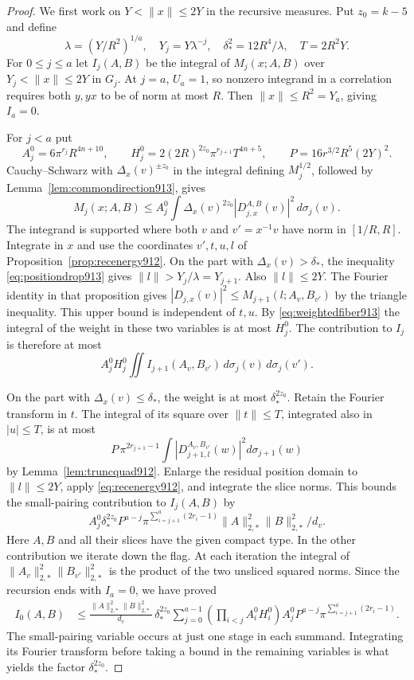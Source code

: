\documentclass[a4paper,11pt]{article}
\theoremstyle{definition}
\theoremstyle{remark}
\numberwithin{equation}{section}
\begin{document}
\begin{proof}
We first work on \(Y<\|x\|\le2Y\) in the recursive measures.
Put \(z_0=k-5\) and define
\[
  \lambda=(Y/R^2)^{1/a},\quad Y_j=Y\lambda^{-j},\quad
  \delta_*^2=12 R^4/\lambda,\quad T=2R^2Y.
\]
For \(0\le j\le a\) let \(I_j(A,B)\) be the integral of
\(M_j(x;A,B)\) over \(Y_j<\|x\|\le2Y\) in \(G_j\).
At \(j=a\), \(U_a=1\), so nonzero integrand in a correlation
requires both \(y,yx\) to be of norm at most \(R\).
Then \(\|x\|\le R^2=Y_a\), giving \(I_a=0\).

For \(j<a\) put
\[
 A_j^0=6\pi^{r_j}R^{4n+10},\qquad
 H_j^0=2(2R)^{2z_0}\pi^{r_{j+1}}T^{4n+5},\qquad
 P=16r^{3/2}R^5(2Y)^2 .
\]
Cauchy--Schwarz with \(\Delta_x(v)^{\pm z_0}\) in the integral
defining \(M_j^{1/2}\), followed by Lemma~\ref{lem:commondirection913},
gives
\[
       M_j(x;A,B)\le A_j^0
          \int \Delta_x(v)^{2z_0}|D_{j,x}^{A,B}(v)|^2\,d\sigma_j(v).
\]
The integrand is supported where both \(v\) and \(v'=x^{-1}v\)
have norm in \([1/R,R]\). Integrate in \(x\) and use the
coordinates \(v',t,u,l\) of Proposition~\ref{prop:recenergy912}.
On the part with \(\Delta_x(v)>\delta_*\), the inequality
\eqref{eq:positiondrop913} gives \(\|l\|>Y_j/\lambda=Y_{j+1}\).
Also \(\|l\|\le2Y\). The Fourier identity in that proposition
gives \(|D_{j,x}(v)|^2\le M_{j+1}(l;A_v,B_{v'})\) by the
triangle inequality. This upper bound is independent of \(t,u\).
By \eqref{eq:weightedfiber913} the integral of the weight in
these two variables is at most \(H_j^0\). The contribution to
\(I_j\) is therefore at most
\[
    A_j^0 H_j^0
       \iint I_{j+1}(A_v,B_{v'})\,d\sigma_j(v)\,d\sigma_j(v').
\]

On the part with \(\Delta_x(v)\le\delta_*\), the weight is at
most \(\delta_*^{2z_0}\). Retain the Fourier transform in \(t\).
The integral of its square over \(\|t\|\le T\), integrated also
in \(|u|\le T\), is at most
\[
 P\,\pi^{2r_{j+1}-1}
     \int |D_{j+1,l}^{A_v,B_{v'}}(w)|^2d\sigma_{j+1}(w)
\]
by Lemma~\ref{lem:truncquad912}. Enlarge the residual position
domain to \(\|l\|\le 2Y\), apply \eqref{eq:recenergy912}, and
integrate the slice norms. This bounds the small-pairing
contribution to \(I_j(A,B)\) by
\[
 A_j^0\delta_*^{2z_0} P^{a-j}
    \pi^{\sum_{i=j+1}^a(2r_i-1)}
                \|A\|_{2,*}^2\|B\|_{2,*}^2/d_v .
\]
Here \(A,B\) and all their slices have the given compact type.
In the other contribution we iterate down the flag. At each
iteration the integral of \(\|A_v\|_{2,*}^2\|B_{v'}\|_{2,*}^2\)
is the product of the two unsliced squared norms. Since the
recursion ends with \(I_a=0\), we have proved
\begin{align}
 I_0(A,B)
 &\le \frac{\|A\|_{2,*}^2\|B\|_{2,*}^2}{d_v}\,
 \delta_*^{2z_0}
 \sum_{j=0}^{a-1}
 \left(\prod_{i<j}A_i^0 H_i^0\right)
 A_j^0 P^{a-j}
 \pi^{\sum_{i=j+1}^a(2r_i-1)} .
 \label{eq:realshell914}
\end{align}
The small-pairing variable occurs at just one stage in
each summand. Integrating its Fourier transform before taking
a bound in the remaining variables is what yields the factor
\(\delta_*^{2z_0}\).


\end{proof}
\end{document}
